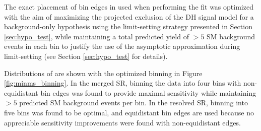 The exact placement of bin edges in \minms used when performing the fit was optimized with the aim of maximizing the projected exclusion of the DH signal model for a background-only hypothesis using the limit-setting strategy presented in Section \ref{sec:hypo_test}, while maintaining a total predicted yield of \(>5\) SM background events in each bin to justify the use of the asymptotic approximation during limit-setting (see Section \ref{sec:hypo_test} for details). 

Distributions of \minms are shown with the optimized binning in Figure \ref{fig:minms_binning}. In the merged SR, binning the data into four \minms bins with non-equidistant bin edges was found to provide maximal sensitivity while maintaining \(>5\) predicted SM background events per bin. In the resolved SR, binning into five \minms bins was found to be optimal, and equidistant bin edges are used because no appreciable sensitivity improvements were found with non-equidistant edges.

